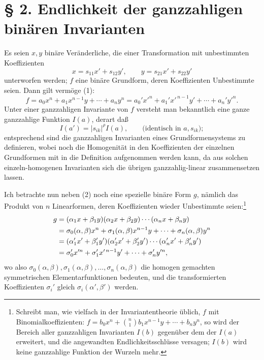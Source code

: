 \documentclass[11pt]{article}
\begin{document}
\setcounter{equation}{0}
\section*{§ 2. Endlichkeit der ganzzahligen binären Invarianten}

Es seien \(x,y\) binäre Veränderliche, die einer Transformation mit unbestimmten Koeffizienten
\begin{equation}
        x=s_{11}x'+s_{12}y',\qquad y=s_{21}x'+s_{22}y'
\end{equation}
unterworfen werden; \(f\) eine binäre Grundform, deren Koeffizienten Unbestimmte seien. Dann gilt vermöge (1):
\begin{equation}
        f=a_0x^n+a_1x^{n-1}y+\cdots+a_ny^n
        =a_0'x'^n+a_1'x'^{\,n-1}y'+\cdots+a_n'y'^n.
\end{equation}
Unter einer ganzzahligen Invariante von \(f\) versteht man bekanntlich eine ganze ganzzahlige Funktion \(I(a)\), derart daß
\begin{equation}
        I(a')=|s_{ik}|^\rho I(a),\qquad \text{(identisch in \(a,s_{ik}\))};
\end{equation}
entsprechend sind die ganzzahligen Invarianten eines Grundformensystems zu definieren, wobei noch die Homogenität in den Koeffizienten der einzelnen Grundformen mit in die Definition aufgenommen werden kann, da aus solchen einzeln-homogenen Invarianten sich die übrigen ganzzahlig-linear zusammensetzen lassen.

Ich betrachte nun neben (2) noch eine spezielle binäre Form \(g\), nämlich das Produkt von \(n\) Linearformen, deren Koeffizienten wieder Unbestimmte seien:\footnote{Schreibt man, wie vielfach in der Invariantentheorie üblich, \(f\) mit Binomialkoeffizienten: \(f=b_0x^n+\binom n1b_1x^{n-1}y+\cdots+b_ny^n\), so wird der Bereich aller ganzzahligen Invarianten \(I(b)\) gegenüber dem der \(I(a)\) erweitert, und die angewandten Endlichkeitsschlüsse versagen; \(I(b)\) wird keine ganzzahlige Funktion der Wurzeln mehr.}
\begin{align}
        g&=(\alpha_1x+\beta_1y)(\alpha_2x+\beta_2y)\cdots(\alpha_nx+\beta_ny)\notag\\
         &=\sigma_0(\alpha,\beta)x^n+\sigma_1(\alpha,\beta)x^{n-1}y+\cdots+\sigma_n(\alpha,\beta)y^n\notag\\
         &=(\alpha_1'x'+\beta_1'y')(\alpha_2'x'+\beta_2'y')\cdots(\alpha_n'x'+\beta_n'y')\notag\\
         &=\sigma_0'x'^n+\sigma_1'x'^{\,n-1}y'+\cdots+\sigma_n'y'^n,
\end{align}
wo also \(\sigma_0(\alpha,\beta),\sigma_1(\alpha,\beta),\ldots,\sigma_n(\alpha,\beta)\) die homogen gemachten symmetrischen Elementarfunktionen bedeuten, und die transformierten Koeffizienten \(\sigma_i'\) gleich \(\sigma_i(\alpha',\beta')\) werden.
\end{document}

